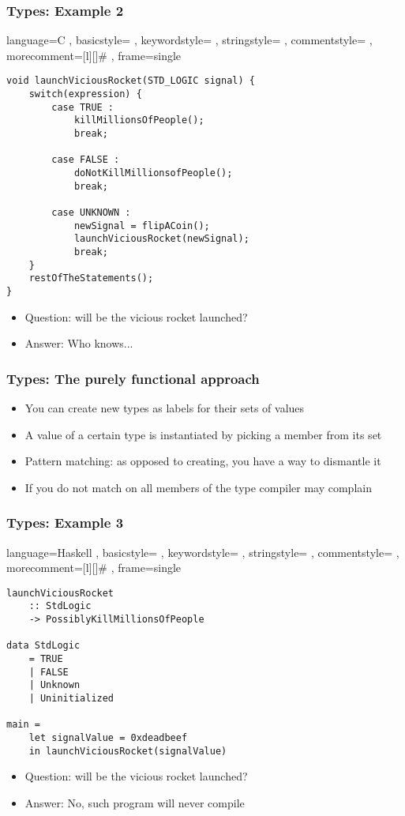 \documentclass[11pt]{beamer}
\begin{document}
\begin{frame}[fragile]
	\frametitle{Types: Example 2}
	
	\lstset
	{ language=C
		, basicstyle=\ttfamily\footnotesize
		, keywordstyle=\color{blue}\ttfamily
		, stringstyle=\color{red}\ttfamily
		, commentstyle=\color{green}\ttfamily
		, morecomment=[l][\color{magenta}]{\#}
		, frame=single
	}
	
\begin{lstlisting}
void launchViciousRocket(STD_LOGIC signal) {
    switch(expression) {
        case TRUE :
            killMillionsOfPeople();
            break;
	
        case FALSE :
            doNotKillMillionsofPeople();
            break;
	
        case UNKNOWN :
            newSignal = flipACoin();
    	    launchViciousRocket(newSignal);
    	    break;
    }
    restOfTheStatements();
}
\end{lstlisting}
	
\begin{itemize}[<+->]
	\item Question: will be the vicious rocket launched?
	\item Answer: Who knows...
\end{itemize}
\end{frame}

	\begin{frame}
		\frametitle{Types: The purely functional approach}
			\begin{itemize}[<+->]
				\item You can create new types as labels for their sets of values
				\item A value of a certain type is instantiated by picking a member from its set
				\item Pattern matching: as opposed to creating, you have a way to dismantle it
				\item If you do not match on all members of the type compiler may complain
			\end{itemize}
	\end{frame}

\begin{frame}[fragile]
\frametitle{Types: Example 3}
\lstset
{ language=Haskell
	, basicstyle=\ttfamily\footnotesize
	, keywordstyle=\color{blue}\ttfamily
	, stringstyle=\color{red}\ttfamily
	, commentstyle=\color{green}\ttfamily
	, morecomment=[l][\color{magenta}]{\#}
	, frame=single
}
\begin{lstlisting}
launchViciousRocket 
    :: StdLogic 
    -> PossiblyKillMillionsOfPeople

data StdLogic
    = TRUE
    | FALSE
    | Unknown
    | Uninitialized
	
main = 
    let signalValue = 0xdeadbeef 
    in launchViciousRocket(signalValue)		
\end{lstlisting}
\begin{itemize}[<+->]
	\item Question: will be the vicious rocket launched?
	\item Answer: No, such program will never compile
\end{itemize}		
\end{frame}
\end{document}
